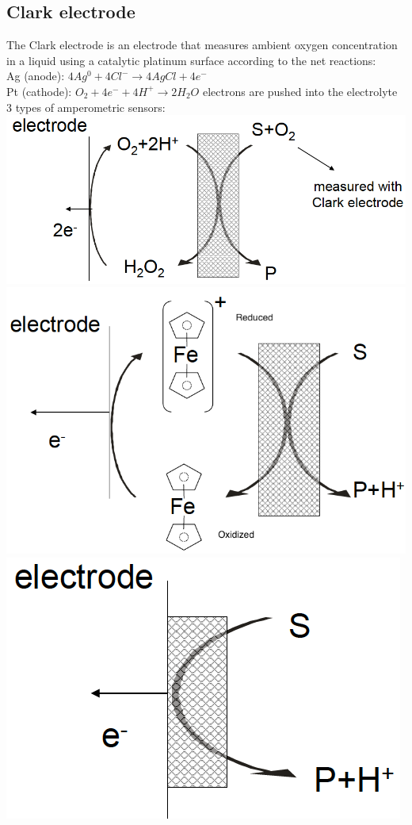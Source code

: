 \documentclass[9pt]{article}
\begin{document}
\begin{multicols}{2}
\subsection{Clark electrode}
The Clark electrode is an electrode that measures ambient oxygen concentration in a liquid using a catalytic platinum surface according to the net reactions:\\
Ag (anode): $4Ag^0+4Cl^- \rightarrow 4AgCl+4e^-$ \\
Pt (cathode): $O_2+4e^-+4H^+ \rightarrow 2H_2O$ electrons are pushed into the electrolyte\\
3 types of amperometric sensors:\\
\includegraphics[scale=0.1]{Images/O2_based_sensor.png}
\includegraphics[scale=0.1]{Images/mediator_based_sensor.png}
\includegraphics[scale=0.1]{Images/Directly-Coupled_Enzymes.png}\\

\end{multicols}
\end{document}
